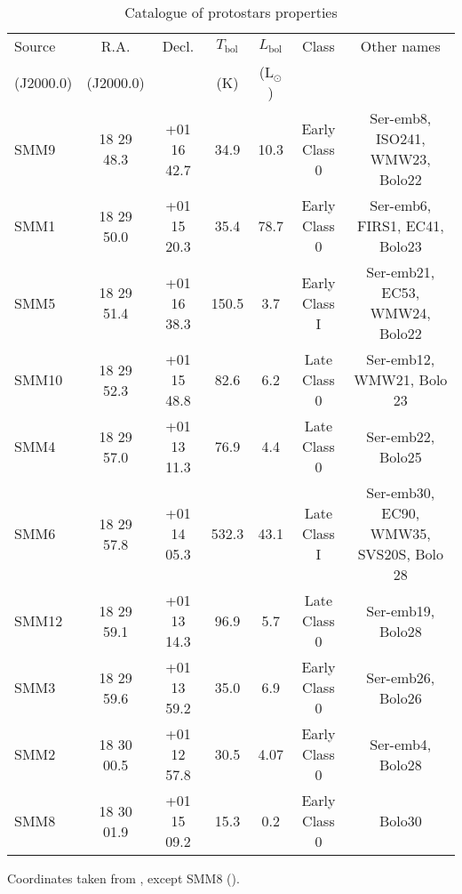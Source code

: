 \documentclass{aa}
\begin{document}
\begin{table*}
\caption{Catalogue of protostars properties}             %
\label{table:2}      %
\centering                          %
\begin{tabular}{l c c c c c c} 
\hline\hline 
Source & R.A. & Decl. & $T_\mathrm{bol}$ &  $L_\mathrm{bol}$  & Class & Other names\\
 (J2000.0) & (J2000.0) & & (K) & (L$_\odot$) & &\\
\hline  

SMM9 & 18 29 48.3 & +01 16 42.7 &  34.9 & 10.3 & Early Class 0 &  Ser-emb8, ISO241, WMW23, Bolo22\\

SMM1 & 18 29 50.0 & +01 15 20.3 & 35.4 & 78.7 & Early Class 0 &  Ser-emb6, FIRS1, EC41, Bolo23\\

SMM5 & 18 29 51.4 & +01 16 38.3 & 150.5 & 3.7 & Early Class I & Ser-emb21, EC53, WMW24, Bolo22 \\

SMM10 & 18 29 52.3 & +01 15 48.8 & 82.6 & 6.2 & Late Class 0 & Ser-emb12, WMW21, Bolo 23\\

SMM4 & 18 29 57.0 & +01 13 11.3 & 76.9 & 4.4 & Late Class 0 &  Ser-emb22, Bolo25\\

SMM6 & 18 29 57.8 & +01 14 05.3 & 532.3 & 43.1 & Late Class I & Ser-emb30, EC90, WMW35, SVS20S, Bolo 28 \\

SMM12 & 18 29 59.1 & +01 13 14.3 & 96.9 & 5.7 & Late Class 0 &  Ser-emb19, Bolo28\\

SMM3 & 18 29 59.6 & +01 13 59.2 & 35.0 & 6.9 & Early Class 0 &  Ser-emb26, Bolo26\\

SMM2 & 18 30 00.5 & +01 12 57.8 & 30.5 & 4.07 & Early Class 0 & Ser-emb4, Bolo28\\

SMM8 & 18 30 01.9 & +01 15 09.2 & 15.3 & 0.2 & Early Class 0 & Bolo30\\
\hline
\end{tabular}
\begin{flushleft}
Coordinates taken from \citealt{Sur16}, except SMM8 (\citealt{Lee14}).\\
\end{flushleft}
\end{table*}
\end{document}
